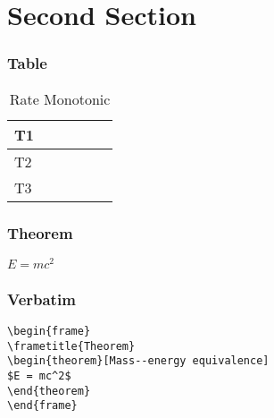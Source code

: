 \documentclass[xcolor=table]{beamer}
\begin{document}
\section{Second Section}

\begin{frame}
\frametitle{Table}
\begin{table}
\centering
\label{RM1}
\begin{tabular}{|l|l|l|l|l|l|}
\hline
T1 & \cellcolor{blue} & \cellcolor{blue} & & & \\ \hline
T2 & & & \cellcolor{red}  & \cellcolor{red} & \\ \hline
T3 & & & & & \cellcolor{green} \\ \hline
\end{tabular}
\caption{Rate Monotonic}
\end{table}
\end{frame}




\begin{frame}
\frametitle{Theorem}
\begin{theorem}
$E = mc^2$
\end{theorem}
\end{frame}


\begin{frame}[fragile] %
\frametitle{Verbatim}
\begin{example}
\begin{verbatim}
\begin{frame}
\frametitle{Theorem}
\begin{theorem}[Mass--energy equivalence]
$E = mc^2$
\end{theorem}
\end{frame}\end{verbatim}
\end{example}
\end{frame}
\end{document}
